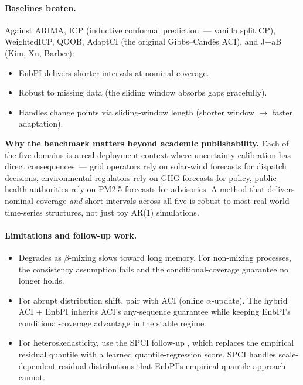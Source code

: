 \documentclass[letterpaper,11pt,leqno]{article}
\begin{document}
\paragraph{Baselines beaten.} Against ARIMA, ICP (inductive conformal prediction~--- vanilla split CP), WeightedICP, QOOB, AdaptCI (the original Gibbs--Cand\`es ACI), and J+aB (Kim, Xu, Barber):
\begin{itemize}
\item EnbPI delivers shorter intervals at nominal coverage.
\item Robust to missing data (the sliding window absorbs gaps gracefully).
\item Handles change points via sliding-window length (shorter window $\to$ faster adaptation).
\end{itemize}

\begin{whymatters}
\textbf{Why the benchmark matters beyond academic publishability.} Each of the five domains is a real deployment context where uncertainty calibration has direct consequences~--- grid operators rely on solar-wind forecasts for dispatch decisions, environmental regulators rely on GHG forecasts for policy, public-health authorities rely on PM2.5 forecasts for advisories. A method that delivers nominal coverage \emph{and} short intervals across all five is robust to most real-world time-series structures, not just toy AR(1) simulations.
\end{whymatters}

\paragraph{Limitations and follow-up work.}

\begin{itemize}
\item Degrades as $\beta$-mixing slows toward long memory. For non-mixing processes, the consistency assumption fails and the conditional-coverage guarantee no longer holds.
\item For abrupt distribution shift, pair with ACI (online $\alpha$-update). The hybrid ACI + EnbPI inherits ACI's any-sequence guarantee while keeping EnbPI's conditional-coverage advantage in the stable regime.
\item For heteroskedasticity, use the SPCI follow-up \cite{xu2022spci}, which replaces the empirical residual quantile with a learned quantile-regression score. SPCI handles scale-dependent residual distributions that EnbPI's empirical-quantile approach cannot.
\end{itemize}
\end{document}
